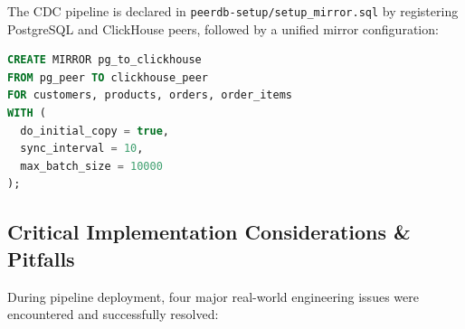 \documentclass[peerreviewca]{IEEEtran}
\begin{document}
The CDC pipeline is declared in \texttt{peerdb-setup/setup\_mirror.sql} by registering PostgreSQL and ClickHouse peers, followed by a unified mirror configuration:
\begin{lstlisting}[language=SQL, caption={PeerDB Mirror creation script.}]
CREATE MIRROR pg_to_clickhouse
FROM pg_peer TO clickhouse_peer
FOR customers, products, orders, order_items
WITH (
  do_initial_copy = true,
  sync_interval = 10,
  max_batch_size = 10000
);
\end{lstlisting}

\subsection{Critical Implementation Considerations \& Pitfalls}
During pipeline deployment, four major real-world engineering issues were encountered and successfully resolved:
\end{document}
